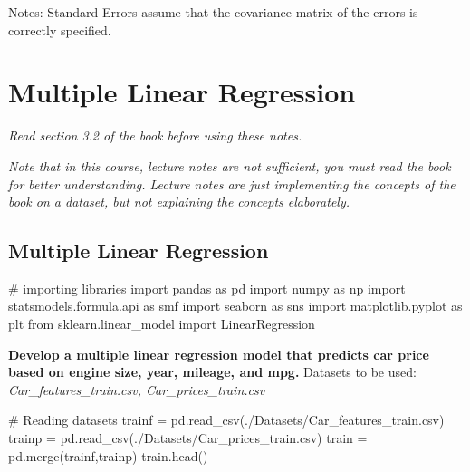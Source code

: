 \documentclass[
  letterpaper,
  DIV=11,
  numbers=noendperiod]{scrreprt}
\newenvironment{Shaded}{\begin{snugshade}}{\end{snugshade}}
\newcommand{\CommentTok}[1]{\textcolor[rgb]{0.37,0.37,0.37}{#1}}
\newcommand{\ImportTok}[1]{\textcolor[rgb]{0.00,0.46,0.62}{#1}}
\newcommand{\NormalTok}[1]{\textcolor[rgb]{0.00,0.23,0.31}{#1}}
\newcommand{\OperatorTok}[1]{\textcolor[rgb]{0.37,0.37,0.37}{#1}}
\newcommand{\StringTok}[1]{\textcolor[rgb]{0.13,0.47,0.30}{#1}}
\begin{document}
Notes: \newline
 [1] Standard Errors assume that the covariance matrix of the errors is correctly specified.


\chapter{Multiple Linear Regression}\label{multiple-linear-regression}

\emph{Read section 3.2 of the book before using these notes.}

\emph{Note that in this course, lecture notes are not sufficient, you
must read the book for better understanding. Lecture notes are just
implementing the concepts of the book on a dataset, but not explaining
the concepts elaborately.}

\section{Multiple Linear Regression}\label{multiple-linear-regression-1}

\begin{Shaded}
\begin{Highlighting}[]
\CommentTok{\# importing libraries }
\ImportTok{import}\NormalTok{ pandas }\ImportTok{as}\NormalTok{ pd}
\ImportTok{import}\NormalTok{ numpy }\ImportTok{as}\NormalTok{ np}
\ImportTok{import}\NormalTok{ statsmodels.formula.api }\ImportTok{as}\NormalTok{ smf}
\ImportTok{import}\NormalTok{ seaborn }\ImportTok{as}\NormalTok{ sns}
\ImportTok{import}\NormalTok{ matplotlib.pyplot }\ImportTok{as}\NormalTok{ plt}
\ImportTok{from}\NormalTok{ sklearn.linear\_model }\ImportTok{import}\NormalTok{ LinearRegression}
\end{Highlighting}
\end{Shaded}

\textbf{Develop a multiple linear regression model that predicts car
price based on engine size, year, mileage, and mpg.} Datasets to be
used: \emph{Car\_features\_train.csv, Car\_prices\_train.csv}

\begin{Shaded}
\begin{Highlighting}[]
\CommentTok{\# Reading datasets}
\NormalTok{trainf }\OperatorTok{=}\NormalTok{ pd.read\_csv(}\StringTok{\textquotesingle{}./Datasets/Car\_features\_train.csv\textquotesingle{}}\NormalTok{)}
\NormalTok{trainp }\OperatorTok{=}\NormalTok{ pd.read\_csv(}\StringTok{\textquotesingle{}./Datasets/Car\_prices\_train.csv\textquotesingle{}}\NormalTok{)}
\NormalTok{train }\OperatorTok{=}\NormalTok{ pd.merge(trainf,trainp)}
\NormalTok{train.head()}
\end{Highlighting}
\end{Shaded}
\end{document}
